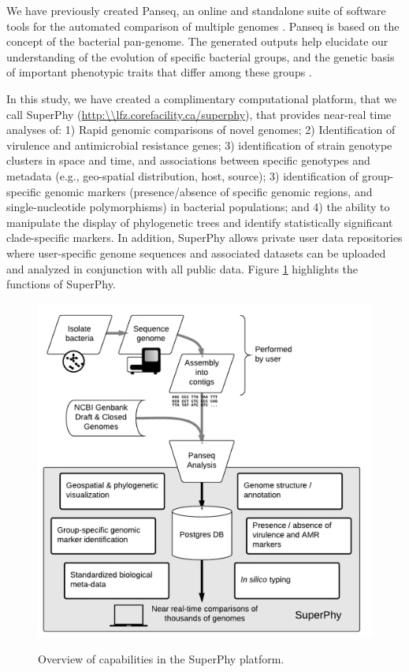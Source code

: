 \documentclass[a4paper,twoside]{article}
\begin{document}
We have previously created Panseq, an online and standalone suite of software tools for the automated comparison of multiple genomes \cite{laing_pan-genome_2010,laing_identification_2011}. Panseq is based on the concept of the bacterial pan-genome. The generated outputs help elucidate our understanding of the evolution of specific bacterial groups, and the genetic basis of important phenotypic traits that differ among these groups \cite{laing_pan-genome_2010}.

In this study, we have created a complimentary computational platform, that we call SuperPhy (\url{http:\\lfz.corefacility.ca/superphy}), that provides near-real time analyses of: 1) Rapid genomic comparisons of novel genomes; 2) Identification of virulence and antimicrobial resistance genes; 3) identification of strain genotype clusters in space and time, and associations between specific genotypes and metadata (e.g., geo-spatial distribution, host, source); 3) identification of group-specific genomic markers (presence/absence of specific genomic regions, and single-nucleotide polymorphisms) in bacterial populations; and 4) the ability to manipulate the display of phylogenetic trees and identify statistically significant clade-specific markers. In addition, SuperPhy allows private user data repositories where user-specific genome sequences and associated datasets can be uploaded and analyzed in conjunction with all public data. Figure \ref{fig:capabilities} highlights the functions of SuperPhy.

\begin{figure}[t]
  \vspace{-0.2cm}
  \centering
   {\includegraphics[width=13cm]{capabilities.pdf}}
  \caption{Overview of capabilities in the SuperPhy platform.}
  \label{fig:capabilities}
\end{figure}
\end{document}
